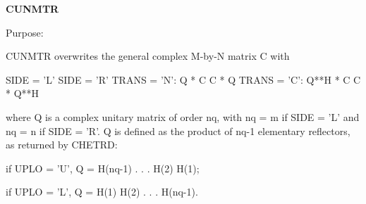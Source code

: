 {\bfseries C\+U\+N\+M\+T\+R} 

 \begin{DoxyParagraph}{Purpose\+: }
\begin{DoxyVerb} CUNMTR overwrites the general complex M-by-N matrix C with

                 SIDE = 'L'     SIDE = 'R'
 TRANS = 'N':      Q * C          C * Q
 TRANS = 'C':      Q**H * C       C * Q**H

 where Q is a complex unitary matrix of order nq, with nq = m if
 SIDE = 'L' and nq = n if SIDE = 'R'. Q is defined as the product of
 nq-1 elementary reflectors, as returned by CHETRD:

 if UPLO = 'U', Q = H(nq-1) . . . H(2) H(1);

 if UPLO = 'L', Q = H(1) H(2) . . . H(nq-1).\end{DoxyVerb}
 
\end{DoxyParagraph}

